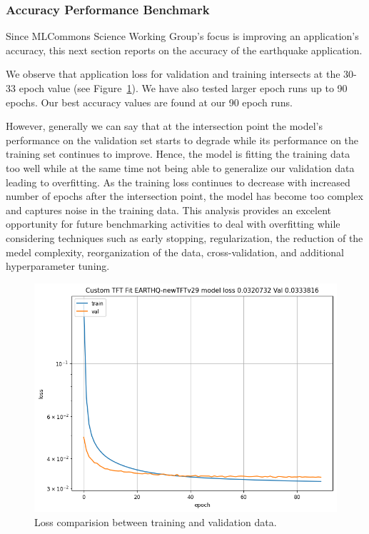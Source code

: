 \documentclass[utf8]{FrontiersinVancouver} %
\begin{document}
\subsubsection{Accuracy Performance Benchmark}
\label{sec:perf-accuracy}

Since MLCommons Science Working Group's focus is improving an application’s accuracy, this next section reports on the accuracy of the earthquake application.

We observe that application loss for validation and training intersects at the 30-33 epoch value (see Figure~\ref{fig:loss}). We have also tested larger epoch runs up to 90 epochs. Our best accuracy values are found at our 90 epoch runs.

However, generally we can say that at the intersection point the model's performance on the validation set starts to degrade while its performance on the training set continues to improve. Hence, the  model is fitting the training data too well while at the same time not being able to generalize our validation data leading to overfitting. As the training loss continues to decrease with increased number of epochs after the intersection point, the model has become too complex and captures noise in the training data. This analysis provides an excelent opportunity for future benchmarking activities to deal with overfitting while considering techniques such as early stopping, regularization, the reduction of the medel complexity, reorganization of the data, cross-validation, and additional hyperparameter tuning. 

\begin{figure}[htb]
    \centering
    \includegraphics[width=0.70\columnwidth]{images/loss90.png}
    \caption{Loss comparision between training and validation data.}
    \label{fig:loss}
\end{figure}
\end{document}
